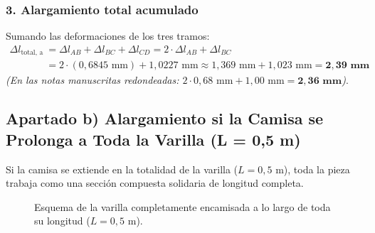 \subsubsection{3. Alargamiento total acumulado}

Sumando las deformaciones de los tres tramos:
\begin{align}
    \Delta l_{\text{total, a}} &= \Delta l_{AB} + \Delta l_{BC} + \Delta l_{CD} = 2 \cdot \Delta l_{AB} + \Delta l_{BC} \nonumber \\
    &= 2 \cdot (0{,}6845\text{ mm}) + 1{,}0227\text{ mm} \approx 1{,}369\text{ mm} + 1{,}023\text{ mm} = \mathbf{2{,}39\text{ mm}}
\end{align}
\textit{(En las notas manuscritas redondeadas: $2 \cdot 0{,}68\text{ mm} + 1{,}00\text{ mm} = \mathbf{2{,}36\text{ mm}}$)}.

\subsection{Apartado b) Alargamiento si la Camisa se Prolonga a Toda la Varilla (L = 0,5 m)}

Si la camisa se extiende en la totalidad de la varilla ($L = 0{,}5\text{ m}$), toda la pieza trabaja como una sección compuesta solidaria de longitud completa.

\begin{figure}[H]
    \centering
    \caption{Esquema de la varilla completamente encamisada a lo largo de toda su longitud ($L = 0{,}5\text{ m}$).}
    \label{fig:varilla_camisa_total}
\end{figure}

